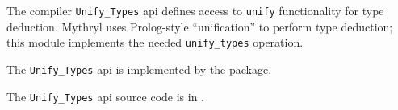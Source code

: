 
The compiler {\tt Unify\_Types} api defines access to {\tt unify} functionality 
for type deduction.  Mythryl uses Prolog-style ``unification'' to perform type 
deduction;  this module implements the needed {\tt unify\_types} operation. 

The {\tt Unify\_Types} api is implemented by the  package.

The {\tt Unify\_Types} api source code is in .


